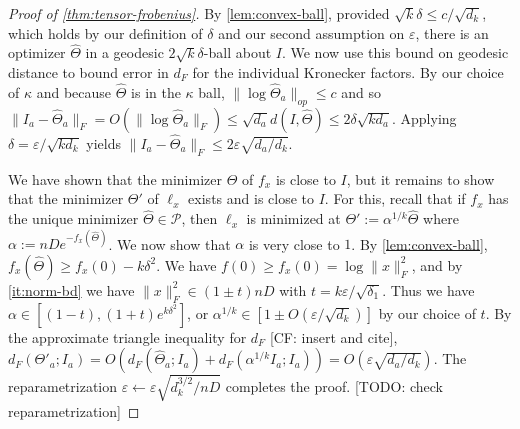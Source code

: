 \documentclass[aos]{imsart}
\theoremstyle{definition}
\newcommand{\eps}{\varepsilon}
\newcommand{\SPD}{\mathcal{P}}
\newcommand{\samp}{x}
\newcommand{\CF}[1]{{\color{purple}[CF: #1]}}
\newcommand{\TODO}[1]{{\color{blue}[TODO: #1]}}
\begin{document}
\begin{proof}[Proof of \cref{thm:tensor-frobenius}]

By \cref{lem:convex-ball}, provided $\sqrt{k} \delta \leq c/\sqrt{d_k}$, which holds by our definition of $\delta$ and our second assumption on $\eps$, there is an optimizer $\widehat{\Theta}$ in a geodesic $2 \sqrt{k} \delta$-ball about $I$. We now use this bound on geodesic distance to bound error in $d_F$ for the individual Kronecker factors. By our choice of $\kappa$ and because $\widehat{\Theta}$ is in the $\kappa$ ball, $\|\log \widehat{\Theta}_a\|_{op} \leq c$ and so $\|I_a - \widehat{\Theta}_a\|_F = O( \| \log \widehat{\Theta}_a\|_F) \leq \sqrt{d_a} d(I, \widehat{\Theta}) \leq 2\delta \sqrt{ k d_a}.$ Applying $\delta = \eps /\sqrt{k d_k}$ yields $\| I_a - \widehat{\Theta}_a\|_F \leq 2\eps \sqrt{ d_a/d_k}$.

We have shown that the minimizer $\widehat{\Theta}$ of $f_\samp$ is close to $I$, but it remains to show that the minimizer $\Theta'$ of $\ell_\samp$ exists and is close to $I$. For this, recall that if $f_\samp$ has the unique minimizer $\widehat{\Theta} \in \SPD$, then $\ell_\samp$ is minimized at $\Theta':= \alpha^{1/k}  \widehat{\Theta}$ where $\alpha:= n D e^{ - f_\samp(\widehat{\Theta})}$. We now show that $\alpha$ is very close to $1$. By \cref{lem:convex-ball}, $f_\samp(\widehat{\Theta}) \geq f_\samp(0) - k\delta^2$. We have $f(0) \geq f_\samp(0) = \log\| \samp\|^2_F$, and by \cref{it:norm-bd} we have $\| \samp\|_F^2 \in (1 \pm t) nD$ with $t = k \eps/\sqrt{\delta_1}$. Thus we have $\alpha \in [(1-t),  (1+t) e^{k \delta^2}]$, or $\alpha^{1/k} \in [1 \pm  O(\eps/\sqrt{d_k})]$ by our choice of $t$. By the approximate triangle inequality for $d_F$ \CF{insert and cite}, $d_F( \Theta'_a; I_a) = O(d_F(\widehat{\Theta}_a; I_a) + d_F(\alpha^{1/k} I_a; I_a)) = O(\eps \sqrt{d_a/d_k})$. The reparametrization $\eps \leftarrow \eps \sqrt{d_k^{3/2}/ n D}$ completes the proof. \TODO{check reparametrization}
\end{proof}



\end{document}

